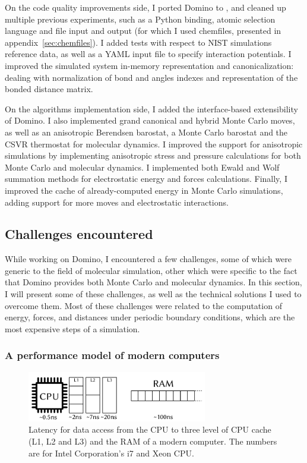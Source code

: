 \documentclass[thesis]{subfiles}
\begin{document}
On the code quality improvements side, I ported Domino to , and cleaned up
multiple previous experiments, such as a Python binding, atomic selection
language and file input and output (for which I used chemfiles, presented in
appendix~\ref{sec:chemfiles}). I added tests with respect to NIST simulations
reference data\cite{NIST}, as well as a YAML input file to specify interaction
potentials. I improved the simulated system in-memory representation and
canonicalization: dealing with normalization of bond and angles indexes and
representation of the bonded distance matrix.

On the algorithms implementation side, I added the interface-based extensibility
of Domino. I also implemented grand canonical and hybrid Monte Carlo moves, as
well as an anisotropic Berendsen barostat, a Monte Carlo barostat and the CSVR
thermostat for molecular dynamics. I improved the support for anisotropic
simulations by implementing anisotropic stress and pressure calculations for
both Monte Carlo and molecular dynamics. I implemented both Ewald and Wolf
summation methods for electrostatic energy and forces calculations. Finally, I
improved the cache of already-computed energy in Monte Carlo simulations, adding
support for more moves and electrostatic interactions.

\subsection{Challenges encountered}

While working on Domino, I encountered a few challenges, some of which were
generic to the field of molecular simulation, other which were specific to the
fact that Domino provides both Monte Carlo and molecular dynamics. In this
section, I will present some of these challenges, as well as the technical
solutions I used to overcome them. Most of these challenges were related to the
computation of energy, forces, and distances under periodic boundary conditions,
which are the most expensive steps of a simulation.

\subsubsection{A performance model of modern computers}
\label{sec:computer-model}

\begin{figure}[b]
    \centering
    \includegraphics[width=0.7\textwidth]{figures/images/computer-model}
    \caption{Latency for data access from the CPU to three level of CPU cache
    (L1, L2 and L3) and the RAM of a modern computer. The numbers are for Intel
    Corporation's i7 and Xeon CPU\cite{SO-CPU-latency}.}
    \label{fig:computer-model}
\end{figure}
\end{document}
